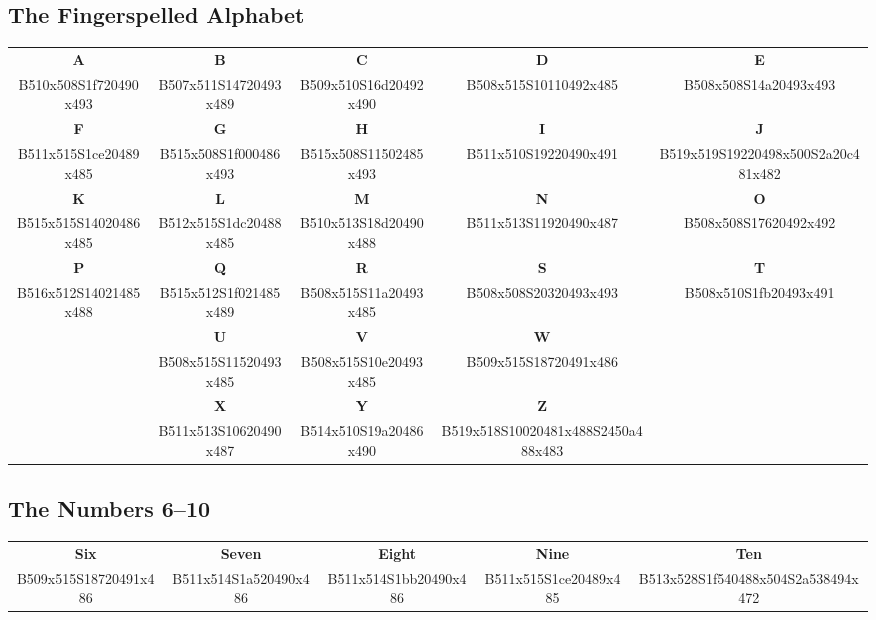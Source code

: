 \documentclass{article}
\begin{document}
\subsection{The Fingerspelled Alphabet}

\begin{center}
\begin{tabular}{*{5}{c}}
\textbf{A}&\textbf{B}&\textbf{C}&\textbf{D}&\textbf{E}\\
B510x508S1f720490x493&B507x511S14720493x489&B509x510S16d20492x490&B508x515S10110492x485&B508x508S14a20493x493\\
\textbf{F}&\textbf{G}&\textbf{H}&\textbf{I}&\textbf{J}\\
B511x515S1ce20489x485&B515x508S1f000486x493&B515x508S11502485x493&B511x510S19220490x491&B519x519S19220498x500S2a20c481x482\\
\textbf{K}&\textbf{L}&\textbf{M}&\textbf{N}&\textbf{O}\\
B515x515S14020486x485&B512x515S1dc20488x485&B510x513S18d20490x488&B511x513S11920490x487&B508x508S17620492x492\\
\textbf{P}&\textbf{Q}&\textbf{R}&\textbf{S}&\textbf{T}\\
B516x512S14021485x488&B515x512S1f021485x489&B508x515S11a20493x485&B508x508S20320493x493&B508x510S1fb20493x491\\
&\textbf{U}&\textbf{V}&\textbf{W}\\
&B508x515S11520493x485&B508x515S10e20493x485&B509x515S18720491x486\\
&\textbf{X}&\textbf{Y}&\textbf{Z}\\
&B511x513S10620490x487&B514x510S19a20486x490&B519x518S10020481x488S2450a488x483\\
\end{tabular}
\end{center}

\subsection{The Numbers 6--10}

\begin{center}
\begin{tabular}{*{5}{c}}
\textbf{Six}&\textbf{Seven}&\textbf{Eight}&\textbf{Nine}&\textbf{Ten}\\
B509x515S18720491x486&B511x514S1a520490x486&B511x514S1bb20490x486&B511x515S1ce20489x485&B513x528S1f540488x504S2a538494x472\\
\end{tabular}
\end{center}
\end{document}
